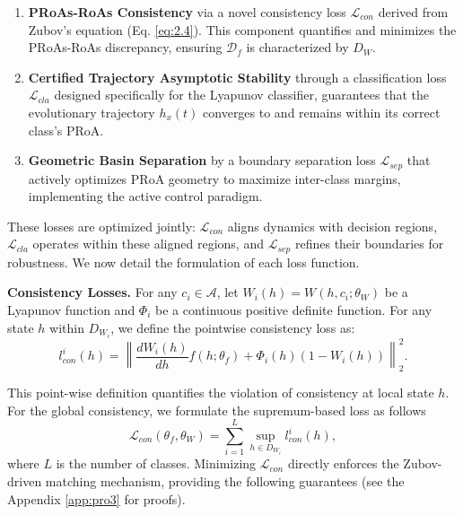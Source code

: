 \documentclass[journal]{IEEEtran}
\begin{document}
\begin{enumerate}
	\item \textbf{PRoAs-RoAs Consistency} via a novel consistency loss $\mathcal{L}_{con}$ derived from Zubov's equation (Eq. \eqref{eq:2.4}). This component quantifies and minimizes the PRoAs-RoAs discrepancy, ensuring $\mathcal{D}_{f}$ is characterized by $D_{W}$.
	
	\item \textbf{Certified Trajectory Asymptotic Stability} through a classification loss $\mathcal{L}_{cla}$ designed specifically for the Lyapunov classifier, guarantees that the evolutionary trajectory $h_x(t)$ converges to and remains within its correct class's PRoA.
	
	\item \textbf{Geometric Basin Separation} by a boundary separation loss $\mathcal{L}_{sep}$ that actively optimizes PRoA geometry to maximize inter-class margins, implementing the active control paradigm.
	
\end{enumerate}
These losses are optimized jointly: $\mathcal{L}_{con}$ aligns dynamics with decision regions, $\mathcal{L}_{cla}$ operates within these aligned regions, and $\mathcal{L}_{sep}$ refines their boundaries for robustness. We now detail the formulation of each loss function.

\vspace{\baselineskip} 
\noindent  \textbf{Consistency Losses.} 
For any $c_i \in \mathcal{A}$, let $W_i(h) = W(h, c_i; \theta_{W})$ be a Lyapunov function and $\Phi_i$ be a continuous positive definite function. For any state $h$ within $D_{W_i}$, we define the pointwise consistency loss as:
\begin{equation*}
	l_{con}^i(h) = \left\| \frac{dW_i(h)}{dh} f(h;\theta_f) + \Phi_i(h)(1 - W_i(h)) \right\|_2^2.
\end{equation*}

This point-wise definition quantifies the violation of consistency at local state $h$. For the global consistency, we formulate the supremum-based loss as follows
\begin{equation}\label{eq:3.4}
	{\mathcal{L}_{con}}\left( \theta_f,\theta_W  \right) = \sum\limits_{i = 1}^L {\mathop {\sup }\limits_{h \in {D_{W_i}}} l_{con}^i(h)},
\end{equation}
where $L$ is the number of classes. Minimizing $\mathcal{L}_{con}$ directly enforces the Zubov-driven matching mechanism, providing the following guarantees (see the Appendix \ref{app:pro3} for proofs).
\end{document}
